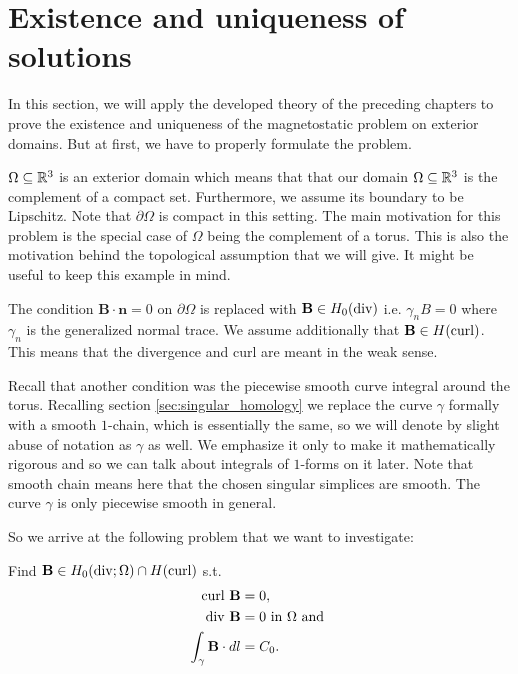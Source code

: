 \documentclass[../master_thesis.tex]{subfiles}
\begin{document}
\section{Existence and uniqueness of solutions}\label{sec:existence_and_uniqueness}

In this section, we will apply the developed theory of the preceding chapters
to prove the existence and uniqueness of the magnetostatic problem 
on exterior domains. But at first, we have to properly formulate the problem.

$\Omega \subseteq \mathbb{R}^3$ is an exterior domain which means that 
that our domain $\Omega \subseteq \mathbb{R}^3$
is the complement of a compact set. Furthermore, we assume its boundary to be 
Lipschitz. Note that $\partial \Omega$ is compact in this setting.
The main motivation for this problem is 
the special case of $\Omega$ being the complement of a torus. 
This is also the motivation behind the
topological assumption that we will give. It might be useful to keep this
example in mind.

The condition $\mathbf{B}\cdot \mathbf{n} = 0$ on $\partial\Omega$ is replaced
with $\mathbf{B} \in H_0(\operatorname{div})$ i.e. $\gamma_n B = 0$ where 
$\gamma_n$ is the generalized normal trace. We assume additionally that 
$\mathbf{B} \in H(\operatorname{curl})$. This means that the divergence and curl are meant in 
the weak sense.

Recall that another condition was the piecewise smooth curve integral around the torus.
Recalling section \ref{sec:singular_homology} we replace the curve $\gamma$
formally with a smooth $1$-chain, which is essentially the same, so we will 
denote by slight abuse of notation as $\gamma$ as well. We emphasize 
it only to make it mathematically rigorous and so we can talk about integrals 
of $1$-forms on it later. Note that smooth chain means here that the chosen 
singular simplices are smooth. The curve $\gamma$ is only piecewise smooth in 
general.

So we arrive at the following problem that we want to investigate:
\begin{problem}\label{prob:magnetostatic_problem}
    Find $\mathbf{B} \in H_0(\operatorname{div};\Omega) \cap H(\operatorname{curl})$ s.t.
    \begin{align}
        \operatorname{curl} \, \mathbf{B} &= 0, \\ 
        \operatorname{div} \, \mathbf{B}  &= 0 \text{ in } \Omega \text{ and }\\
        \int_\gamma \mathbf{B} \cdot dl &= C_0.
    \end{align}
\end{problem}
\end{document}

